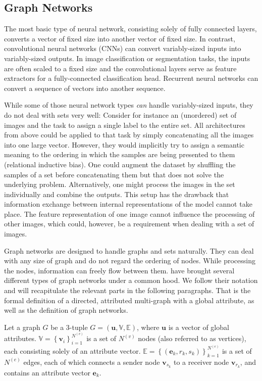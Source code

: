 \subsection{Graph Networks}
\label{sec:graphnetworks}

The most basic type of neural network, consisting solely of fully connected layers, converts a vector of fixed size into another vector of fixed size.
In contrast, convolutional neural networks (CNNs) can convert variably-sized inputs into variably-sized outputs. In image classification or segmentation tasks, the inputs are often scaled to a fixed size and the convolutional layers serve as feature extractors for a fully-connected classification head.
Recurrent neural networks can convert a sequence of vectors into another sequence.

While some of those neural network types \textit{can} handle variably-sized inputs, they do not deal with sets very well: Consider for instance an (unordered) set of images and the task to assign a single label to the entire set. All architectures from above could be applied to that task by simply concatenating all the images into one large vector. However, they would implicitly try to assign a semantic meaning to the ordering in which the samples are being presented to them (relational inductive bias). One could augment the dataset by shuffling the samples of a set before concatenating them but that does not solve the underlying problem. Alternatively, one might process the images in the set individually and combine the outputs. This setup has the drawback that information exchange between internal representations of the model cannot take place. The feature representation of one image cannot influence the processing of other images, which could, however, be a requirement when dealing with a set of images.

Graph networks are designed to handle graphs and sets naturally. They can deal with any size of graph and do not regard the ordering of nodes. While processing the nodes, information can freely flow between them. \cite{deepmind:graphnets} have brought several different types of graph networks under a common hood. We follow their notation and will recapitulate the relevant parts in the following paragraphs. That is the formal definition of a directed, attributed multi-graph with a global attribute, as well as the definition of graph networks.

Let a graph $G$ be a 3-tuple $G=\left(\bm{u},\mathbb{V},\mathbb{E}\right)$, where $\bm{u}$ is a vector of global attributes.
$\mathbb{V}=\left\{\bm{v}_i\right\}_{i=1}^{N^{(v)}}$ is a set of $N^{(v)}$ nodes (also referred to as vertices), each consisting solely of an attribute vector.
$\mathbb{E}=\left\{\left(\bm{e}_k,r_k,s_k\right)\right\}_{k=1}^{N^{(e)}}$ is a set of $N^{(e)}$ edges, each of which connects a sender node $\bm{v}_{s_k}$ to a receiver node $\bm{v}_{r_k}$, and contains an attribute vector $\bm{e}_k$.

